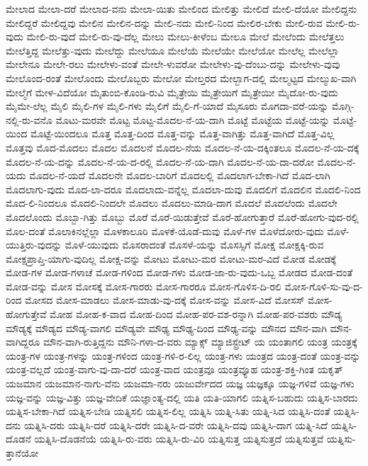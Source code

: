{ಮೇಲಾದ
ಮೇಲಾ-ದರೆ
ಮೇಲಾದ-ವನು
ಮೇಲಾ-ಯಿತು
ಮೇಲಿಂದ
ಮೇಲಿತ್ತು
ಮೇಲಿದೆ
ಮೇಲಿ-ದೆಯೋ
ಮೇಲಿದ್ದನು
ಮೇಲಿದ್ದರೆ
ಮೇಲಿದ್ದವು
ಮೇಲಿನ
ಮೇಲಿನ-ದನ್ನು
ಮೇಲಿ-ನದು
ಮೇಲಿ-ನಿಂದ
ಮೇಲಿರ-ಬೇಕು
ಮೇಲಿ-ರುವ
ಮೇಲಿ-ರು-ವುದು
ಮೇಲಿ-ರು-ವುದೆ
ಮೇಲಿ-ರು-ವು-ದೆಲ್ಲ
ಮೇಲು
ಮೇಲು-ಕೀಳೆಂಬ
ಮೇಲೂ
ಮೇಲೆ
ಮೇಲೆಂದು
ಮೇಲೆತ್ತಲು
ಮೇಲೆತ್ತಿದ್ದ
ಮೇಲೆತ್ತು-ವುದು
ಮೇಲೆದ್ದು
ಮೇಲೆಯೂ
ಮೇಲೆಯೆ
ಮೇಲೆಯೇ
ಮೇಲೆಯೋ
ಮೇಲೆಲ್ಲ
ಮೇಲೆಲ್ಲಾ
ಮೇಲೇನೂ
ಮೇಲೇ-ರಲು
ಮೇಲೇಳು-ವಂತೆ
ಮೇಲೇ-ಳುವರೋ
ಮೇಲೇಳು-ವು-ದೆಂಬು-ದನ್ನು
ಮೇಲೇಳು-ವುವು
ಮೇಲೊಂದ-ರಂತೆ
ಮೇಲೊಂದು
ಮೇಲೊಬ್ಬರು
ಮೇಲೋ
ಮೇಲ್ತರದ
ಮೇಲ್ಬಾಗ-ದಲ್ಲಿ
ಮೇಲ್ಮಟ್ಟದ
ಮೇಲ್ಮುಖ-ವಾಗಿ
ಮೇಲ್ಮೆಗೆ
ಮೇಳ-ವಿದೆಯೋ
ಮೈತುಂಬಿ-ಕೊಂಡಿ-ರುವಿ
ಮೈತ್ರೇಯಿ
ಮೈತ್ರೇಯಿಗೆ
ಮೈತ್ರೇಯೀ
ಮೈದೋ-ರು-ವುದು
ಮೈಮೇ-ಲೆಲ್ಲ
ಮೈಲಿ
ಮೈಲಿ-ಗಳ
ಮೈಲಿ-ಗಳು
ಮೈಲಿಗೆ
ಮೈಲಿ-ಗೆ-ಯಾದೆ
ಮೈಸೂರು
ಮೊಗದಾ-ವರೆ-ಯನ್ನು
ಮೊಗ್ಗಿ-ನಲ್ಲಿ-ರು-ವನೊ
ಮೊಟು-ಮರವೇ
ಮೊಟ್ಟ
ಮೊಟ್ಟ-ಮೊದಲ-ನೆ-ಯ-ದಾಗಿ
ಮೊಟ್ಟೆ
ಮೊಟ್ಟೆಯ
ಮೊಟ್ಟೆ-ಯನ್ನು
ಮೊಟ್ಟೆ-ಯಿಂದ
ಮೊಟ್ಟೆ-ಯಿಂದಲೂ
ಮೊತ್ತ
ಮೊತ್ತ-ದಿಂದ
ಮೊತ್ತ-ವನ್ನು
ಮೊತ್ತ-ವಾಗಿತ್ತು
ಮೊತ್ತ-ವಾಗಿದೆ
ಮೊತ್ತ-ವಿಲ್ಲ
ಮೊತ್ತವು
ಮೊದ-ಮೊದಲು
ಮೊದಲ
ಮೊದಲನೆ
ಮೊದಲ-ನೆಯ
ಮೊದಲ-ನೆ-ಯ-ದಕ್ಕಿಂತಲೂ
ಮೊದಲ-ನೆ-ಯ-ದಕ್ಕೆ
ಮೊದಲ-ನೆ-ಯ-ದನ್ನು
ಮೊದಲ-ನೆ-ಯ-ದ-ರಲ್ಲಿ
ಮೊದಲ-ನೆ-ಯ-ದಾಗಿ
ಮೊದಲ-ನೆ-ಯ-ದಾ-ದರೋ
ಮೊದಲ-ನೆ-ಯದು
ಮೊದಲ-ನೆ-ಯದೆ
ಮೊದಲನೇ
ಮೊದಲ-ಬಾರಿಗೆ
ಮೊದಲಲ್ಲಿ
ಮೊದಲಾಗ-ಬೇಕಾ-ಗಿದೆ
ಮೊದ-ಲಾಗಿ
ಮೊದಲಾಗು-ವುದು
ಮೊದ-ಲಾ-ದರೂ
ಮೊದಲಾದು-ವನ್ನೆಲ್ಲ
ಮೊದಲಾ-ದುವು
ಮೊದಲಿಗೆ
ಮೊದಲಿನ
ಮೊದಲಿ-ನಿಂದ
ಮೊದ-ಲಿ-ನಿಂದಲೂ
ಮೊದಲಿ-ನಿಂದಲೇ
ಮೊದಲು
ಮೊದಲು-ಮಾಡಿ-ದಾಗ
ಮೊದಲೆ
ಮೊದಲೆಂದು
ಮೊದಲೇ
ಮೊದಲೊಂದು
ಮೊಬ್ಬಾ-ಗಿತ್ತು
ಮೊಬ್ಬು
ಮೊರೆ
ಮೊರೆ-ಯಿಡುತ್ತೇವೆ
ಮೊರೆ-ಹೋಗುತ್ತಾರೆ
ಮೊರೆ-ಹೋಗು-ವುದ-ರಲ್ಲಿ
ಮೊಲ-ದಂತೆ
ಮೊಲಾಕಿನಲ್ಲೆಲ್ಲಾ
ಮೊಳಕಾಲೂರಿ
ಮೊಳಕೆ-ಯೊಡೆ-ದುವು
ಮೊಳೆ-ಗಳ
ಮೊಳೆದೋರು-ವುದು
ಮೊಳೆ-ಯುತ್ತಿರು-ವುದನ್ನು
ಮೊಳೆ-ಯುವುದು
ಮೊಸರಾದಂತೆ
ಮೊಸಳೆ-ಯನ್ನು
ಮೊಸಸ್ಸಿಗೆ
ಮೋಕ್ಷ
ಮೋಕ್ಷಕ್ಕಿ-ರುವ
ಮೋಕ್ಷಪ್ರಾಪ್ತಿ-ಯಾಗು-ವುದಿಲ್ಲ
ಮೋಕ್ಷ-ವನ್ನು
ಮೋಟು
ಮೋಟು-ಮರ
ಮೋಟು-ಮರ-ವಿದೆ
ಮೋಡ
ಮೋಡಕ್ಕೆ
ಮೋಡ-ಗಳ
ಮೋಡ-ಗಳಾಚೆ
ಮೋಡ-ಗಳಿಂದ
ಮೋಡ-ಗಳು
ಮೋಡ-ಜಾ-ರು-ವುದು-ಒಬ್ಬ
ಮೋಡದ
ಮೋಡ-ದಂತೆ
ಮೋಡ-ವನ್ನು
ಮೋಸ
ಮೋಸಕ್ಕೆ
ಮೋಸ-ಗಾರರು
ಮೋಸ-ಗಾರರೂ
ಮೋಸ-ಗೊಳಿಸ-ದಿ-ರಲಿ
ಮೋಸ-ಗೊಳಿ-ಸು-ವು-ದ-ರಿಂದ
ಮೋಸದ
ಮೋಸ-ಮಾಡಲು
ಮೋಸ-ಮಾಡು-ವು-ದಕ್ಕೆ
ಮೋಸ-ವನ್ನು
ಮೋಸ-ವಿದೆ
ಮೋಸಸ್
ಮೋಸ-ಹೋಗುತ್ತೇವೆ
ಮೋಹ
ಮೋಹ-ಕ-ವಾದ
ಮೋಹ-ದಿಂದ
ಮೋಹ-ಪರ-ವಶ-ರನ್ನಾಗಿ
ಮೋಹ-ಪರ-ವಶರು
ಮೌಡ್ಯ
ಮೌಡ್ಯಕ್ಕೆ
ಮೌಡ್ಯದ
ಮೌಡ್ಯ-ವಾಗಲಿ
ಮೌಡ್ಯವೇ
ಮೌಢ್ಯ
ಮೌಢ್ಯ-ದಿಂದ
ಮೌಢ್ಯ-ವನ್ನು
ಮೌನದ
ಮೌನ-ವಾಗಿ
ಮೌನ-ವಾಗಿದ್ದರೂ
ಮೌನ-ವಾಗಿ-ರುತ್ತಿದ್ದನು
ಮೌನಿ-ಗಳಾ-ದ-ವರು
ಮ್ಯಾಕ್ಸ್
ಮ್ಯಾಜಿಸ್ಟ್ರೇಟ್
ಯ
ಯಂತಾಗಲಿ
ಯಂತ್ರ
ಯಂತ್ರಕ್ಕೆ
ಯಂತ್ರ-ಗಳ
ಯಂತ್ರ-ಗಳನ್ನು
ಯಂತ್ರ-ಗಳಿಂದ
ಯಂತ್ರ-ಗಳಿ-ರ-ಲಿಲ್ಲ
ಯಂತ್ರ-ಗಳು
ಯಂತ್ರದ
ಯಂತ್ರ-ದಂತೆ
ಯಂತ್ರ-ವನ್ನು
ಯಂತ್ರ-ವಲ್ಲದೆ
ಯಂತ್ರ-ವಾಗು-ವು-ದಾ-ದರೆ
ಯಂತ್ರ-ವಾದ
ಯಂತ್ರವೂ
ಯಂತ್ರವ್ಯೂಹ
ಯಂತ್ರ-ಶಕ್ತಿ-ಗಿಂತ
ಯಕೃತ್
ಯಜಮಾನ
ಯಜಮಾನ-ನಾಗು-ವೆನು
ಯಜಮಾ-ನರು
ಯಜುರ್ವೇದದ
ಯಜ್ಞ
ಯಜ್ಞಕ್ಕೂ
ಯಜ್ಞ-ಗಳಿವೆ
ಯಜ್ಞ-ಗಳು
ಯಜ್ಞ-ವನ್ನು
ಯಜ್ಞ-ವಿತ್ತು
ಯಜ್ಞ-ವೇದಿಕೆ
ಯಜ್ಞಾಂತ್ಯ-ದಲ್ಲಿ
ಯತಿ
ಯತಿ-ಯಾಗಲಿ
ಯತ್ನಿಸ-ಬಹುದು
ಯತ್ನಿಸ-ಬಾರದು
ಯತ್ನಿಸ-ಬೇಕಾ-ಗಿದೆ
ಯತ್ನಿಸ-ಬೇಡಿ
ಯತ್ನಿಸಲಿ
ಯತ್ನಿಸ-ಲಿಲ್ಲ
ಯತ್ನಿಸಿ
ಯತ್ನಿ-ಸಿತು
ಯತ್ನಿ-ಸಿದ
ಯತ್ನಿಸಿ-ದಂತೆ
ಯತ್ನಿಸಿ-ದನು
ಯತ್ನಿಸಿ-ದರು
ಯತ್ನಿಸಿ-ದರೆ
ಯತ್ನಿಸಿ-ದರೇ
ಯತ್ನಿಸಿ-ದ-ವರೇ
ಯತ್ನಿಸಿ-ದವು
ಯತ್ನಿಸಿ-ದಾಗ
ಯತ್ನಿ-ಸಿದೆ
ಯತ್ನಿಸಿ-ದೊಡನೆ
ಯತ್ನಿಸಿ-ದೊಡನೆಯೆ
ಯತ್ನಿಸಿ-ರು-ವರು
ಯತ್ನಿಸಿ-ರು-ವಿರಿ
ಯತ್ನಿಸುತ್ತ
ಯತ್ನಿಸುತ್ತದೆ
ಯತ್ನಿಸುತ್ತವೆ
ಯತ್ನಿಸು-ತ್ತಾನೆಯೋ
}
